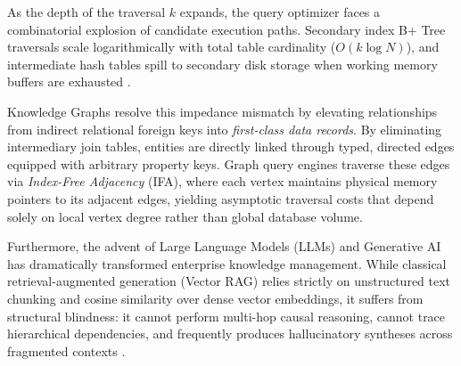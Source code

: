\documentclass[10pt,twocolumn,letterpaper]{article}
\begin{document}
As the depth of the traversal $k$ expands, the query optimizer faces a combinatorial explosion of candidate execution paths. Secondary index B+ Tree traversals scale logarithmically with total table cardinality ($O(k \log N)$), and intermediate hash tables spill to secondary disk storage when working memory buffers are exhausted \cite{stonebraker2005end}.

Knowledge Graphs resolve this impedance mismatch by elevating relationships from indirect relational foreign keys into \textit{first-class data records}. By eliminating intermediary join tables, entities are directly linked through typed, directed edges equipped with arbitrary property keys. Graph query engines traverse these edges via \textit{Index-Free Adjacency} (IFA), where each vertex maintains physical memory pointers to its adjacent edges, yielding asymptotic traversal costs that depend solely on local vertex degree rather than global database volume.

Furthermore, the advent of Large Language Models (LLMs) and Generative AI has dramatically transformed enterprise knowledge management. While classical retrieval-augmented generation (Vector RAG) relies strictly on unstructured text chunking and cosine similarity over dense vector embeddings, it suffers from structural blindness: it cannot perform multi-hop causal reasoning, cannot trace hierarchical dependencies, and frequently produces hallucinatory syntheses across fragmented contexts \cite{edge2024graphrag}. 
\end{document}
